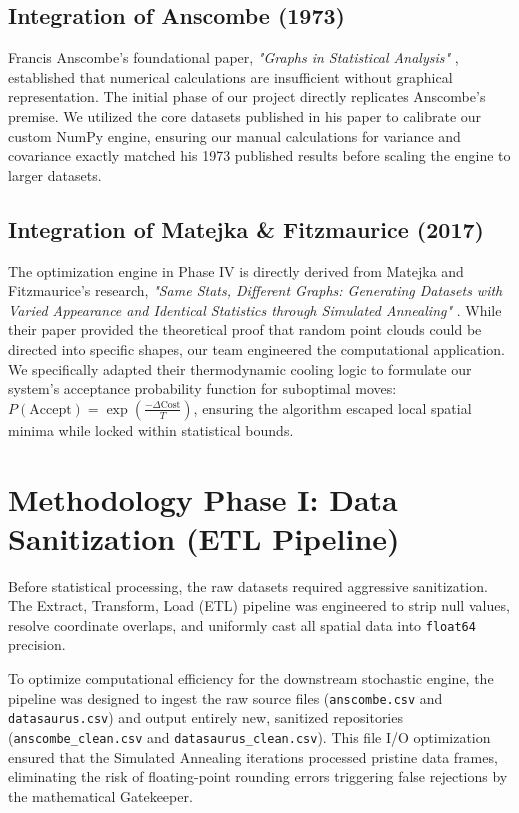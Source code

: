 \documentclass[12pt, a4paper]{article}
\begin{document}
\subsection{Integration of Anscombe (1973)}
Francis Anscombe's foundational paper, \textit{"Graphs in Statistical Analysis"} \cite{anscombe1973}, established that numerical calculations are insufficient without graphical representation. The initial phase of our project directly replicates Anscombe's premise. We utilized the core datasets published in his paper to calibrate our custom NumPy engine, ensuring our manual calculations for variance and covariance exactly matched his 1973 published results before scaling the engine to larger datasets.

\subsection{Integration of Matejka \& Fitzmaurice (2017)}
The optimization engine in Phase IV is directly derived from Matejka and Fitzmaurice's research, \textit{"Same Stats, Different Graphs: Generating Datasets with Varied Appearance and Identical Statistics through Simulated Annealing"} \cite{matejka2017}. While their paper provided the theoretical proof that random point clouds could be directed into specific shapes, our team engineered the computational application. We specifically adapted their thermodynamic cooling logic to formulate our system's acceptance probability function for suboptimal moves: $P(\text{Accept}) = \exp\left(\frac{-\Delta \text{Cost}}{T}\right)$, ensuring the algorithm escaped local spatial minima while locked within statistical bounds.

\newpage
\section{Methodology Phase I: Data Sanitization (ETL Pipeline)}
Before statistical processing, the raw datasets required aggressive sanitization. The Extract, Transform, Load (ETL) pipeline was engineered to strip null values, resolve coordinate overlaps, and uniformly cast all spatial data into \texttt{float64} precision. 

To optimize computational efficiency for the downstream stochastic engine, the pipeline was designed to ingest the raw source files (\texttt{anscombe.csv} and \texttt{datasaurus.csv}) and output entirely new, sanitized repositories (\texttt{anscombe\_clean.csv} and \texttt{datasaurus\_clean.csv}). This file I/O optimization ensured that the Simulated Annealing iterations processed pristine data frames, eliminating the risk of floating-point rounding errors triggering false rejections by the mathematical Gatekeeper.
\end{document}
